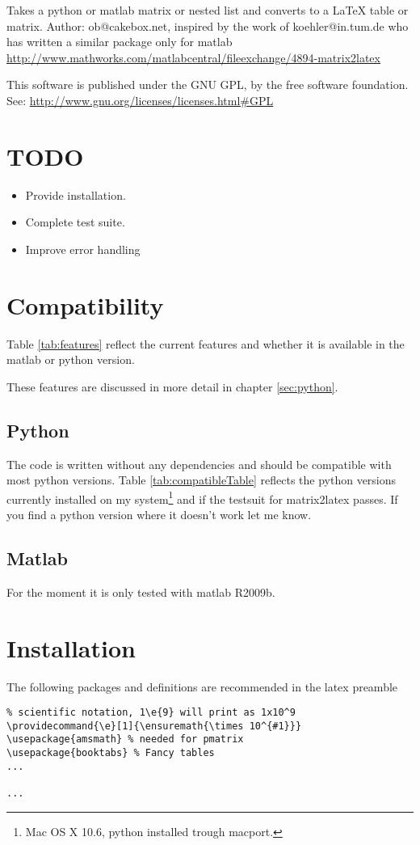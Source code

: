 Takes a python or matlab matrix or nested list and converts to a LaTeX table or matrix.
Author: ob@cakebox.net, inspired by the work of koehler@in.tum.de who has written
a similar package only for matlab
\url{http://www.mathworks.com/matlabcentral/fileexchange/4894-matrix2latex}

This software is published under the GNU GPL, by the free software
foundation. See:
\url{http://www.gnu.org/licenses/licenses.html#GPL}

\section{TODO}
\begin{itemize}
\item Provide installation.
\item Complete test suite.
\item Improve error handling
\end{itemize}

\section{Compatibility}
Table \ref{tab:features} reflect the current features and whether it is available
in the matlab or python version.

These features are discussed in more detail in chapter \ref{sec:python}.

\subsection{Python}
The code is written without any dependencies and should be compatible with most python versions.
Table \ref{tab:compatibleTable} reflects the python versions currently installed
on my system\footnote{Mac OS X 10.6, python installed trough macport.}
and if the testsuit for matrix2latex passes. If you find a python version where
it doesn't work let me know.

\subsection{Matlab}
For the moment it is only tested with matlab R2009b.

\section{Installation}
The following packages and definitions are recommended in the latex preamble 
\begin{verbatim}
% scientific notation, 1\e{9} will print as 1x10^9
\providecommand{\e}[1]{\ensuremath{\times 10^{#1}}}
\usepackage{amsmath} % needed for pmatrix
\usepackage{booktabs} % Fancy tables
...

...
\end{verbatim}
